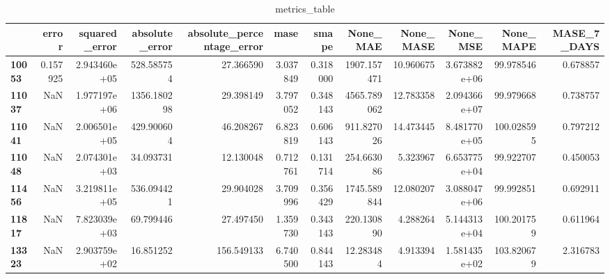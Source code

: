 \begin{table}[h]
\centering
\caption{metrics_table}
\label{table:PRedict low-variance dataset with lstm}
\begin{tabular}{lrrrrrrrrrrr}
\toprule
{} &     error &  squared\_error &  absolute\_error &  absolute\_percentage\_error &      mase &     smape &     None\_MAE &  None\_MASE &      None\_MSE &   None\_MAPE &  MASE\_7\_DAYS \\
\midrule
\textbf{10053} &  0.157925 &   2.943460e+05 &      528.585754 &                  27.366590 &  3.037849 &  0.318000 &  1907.157471 &  10.960675 &  3.673882e+06 &   99.978546 &     0.678857 \\
\textbf{11037} &       NaN &   1.977197e+06 &     1356.180298 &                  29.398149 &  3.797052 &  0.348143 &  4565.789062 &  12.783358 &  2.094366e+07 &   99.979668 &     0.738757 \\
\textbf{11041} &       NaN &   2.006501e+05 &      429.900604 &                  46.208267 &  6.823819 &  0.606143 &   911.827026 &  14.473445 &  8.481770e+05 &  100.028595 &     0.797212 \\
\textbf{11048} &       NaN &   2.074301e+03 &       34.093731 &                  12.130048 &  0.712761 &  0.131714 &   254.663086 &   5.323967 &  6.653775e+04 &   99.922707 &     0.450053 \\
\textbf{11456} &       NaN &   3.219811e+05 &      536.094421 &                  29.904028 &  3.709996 &  0.356429 &  1745.589844 &  12.080207 &  3.088047e+06 &   99.992851 &     0.692911 \\
\textbf{11817} &       NaN &   7.823039e+03 &       69.799446 &                  27.497450 &  1.359730 &  0.343143 &   220.130890 &   4.288264 &  5.144313e+04 &  100.201759 &     0.611964 \\
\textbf{13323} &       NaN &   2.903759e+02 &       16.851252 &                 156.549133 &  6.740500 &  0.844143 &    12.283484 &   4.913394 &  1.581435e+02 &  103.820679 &     2.316783 \\
\bottomrule
\end{tabular}
\end{table}
